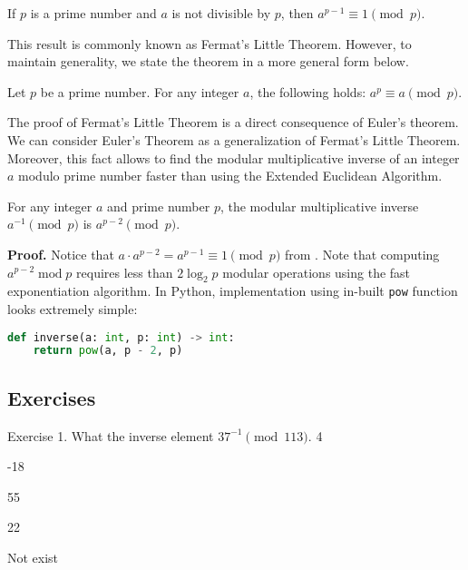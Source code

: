 \documentclass[../lecture-notes-148x210.tex]{subfiles}
\begin{document}
\begin{corollary} \label{cor:fermat_little_theorem}
    If $p$ is a prime number and $a$ is not divisible by $p$, then $a^{p - 1} \equiv 1 \pmod{p}$.
\end{corollary}
This result is commonly known as Fermat's Little Theorem. However, to maintain generality, 
we state the theorem in a more general form below.

\begin{theorem}  \label{th:fermat_little_theorem}
    Let $p$ be a prime number. For any integer $a$, the following holds: $a^{p} \equiv a \pmod{p}$.
\end{theorem}

The proof of Fermat's Little Theorem is a direct consequence of Euler's theorem.
We can consider Euler's Theorem as a generalization of Fermat's Little Theorem. Moreover,
this fact allows to find the modular multiplicative inverse of an integer $a$ modulo prime 
number faster than using the Extended Euclidean Algorithm.

\begin{corollary}
    For any integer $a$ and prime number $p$, the modular multiplicative inverse $a^{-1} \pmod{p}$ is $a^{p-2} \pmod{p}$.
\end{corollary}

\textbf{Proof.} Notice that $a \cdot a^{p-2} = a^{p-1} \equiv 1 \pmod{p}$ from . 
Note that computing $a^{p-2} \; \text{mod} \; p$ requires less than $2\log_2p$ modular operations using 
the fast exponentiation algorithm. In Python, implementation using in-built \texttt{pow} function 
looks extremely simple:
\begin{lstlisting}[language=Python]
def inverse(a: int, p: int) -> int:
    return pow(a, p - 2, p)
\end{lstlisting}

\subsection{Exercises}

\begin{xexercise}
    {Exercise 1.}
    {What the inverse element $37^{-1} \pmod{113}$.}
    {4}
    {
        \item -18
        \item 55
        \item 22
        \item Not exist
    }
\end{xexercise}
\end{document}
